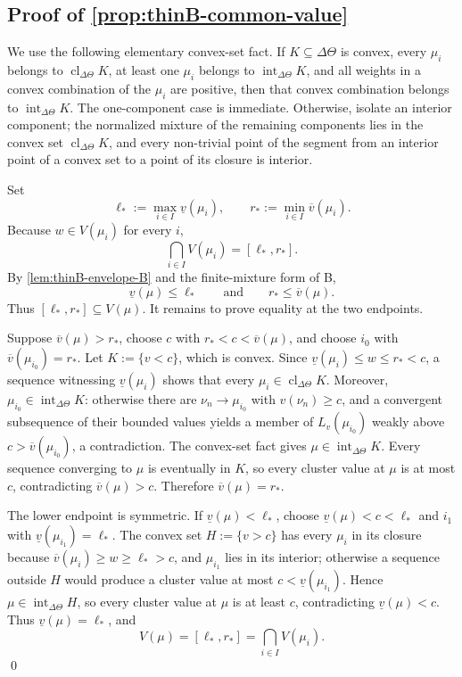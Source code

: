 \documentclass[11pt]{article}
\begin{document}
\subsection*{Proof of \cref{prop:thinB-common-value}}
We use the following elementary convex-set fact. If $K\subseteq\Delta\Theta$ is convex, every $\mu_i$ belongs to $\operatorname{cl}_{\Delta\Theta}K$, at least one $\mu_i$ belongs to $\operatorname{int}_{\Delta\Theta}K$, and all weights in a convex combination of the $\mu_i$ are positive, then that convex combination belongs to $\operatorname{int}_{\Delta\Theta}K$. The one-component case is immediate. Otherwise, isolate an interior component; the normalized mixture of the remaining components lies in the convex set $\operatorname{cl}_{\Delta\Theta}K$, and every non-trivial point of the segment from an interior point of a convex set to a point of its closure is interior.

Set
\[
    \ell_*:=\max_{i\in I}\underline v(\mu_i),
    \qquad
    r_*:=\min_{i\in I}\overline v(\mu_i).
\]
Because $w\in V(\mu_i)$ for every $i$,
\[
    \bigcap_{i\in I}V(\mu_i)=[\ell_*,r_*].
\]
By \cref{lem:thinB-envelope-B} and the finite-mixture form of B,
\[
    \underline v(\mu)\leq\ell_*
    \qquad\text{and}\qquad
    r_*\leq\overline v(\mu).
\]
Thus $[\ell_*,r_*]\subseteq V(\mu)$. It remains to prove equality at the two endpoints.

Suppose $\overline v(\mu)>r_*$, choose $c$ with $r_*<c<\overline v(\mu)$, and choose $i_0$ with $\overline v(\mu_{i_0})=r_*$. Let $K:=\{v<c\}$, which is convex. Since $\underline v(\mu_i)\leq w\leq r_*<c$, a sequence witnessing $\underline v(\mu_i)$ shows that every $\mu_i\in\operatorname{cl}_{\Delta\Theta}K$. Moreover, $\mu_{i_0}\in\operatorname{int}_{\Delta\Theta}K$: otherwise there are $\nu_n\to\mu_{i_0}$ with $v(\nu_n)\geq c$, and a convergent subsequence of their bounded values yields a member of $L_v(\mu_{i_0})$ weakly above $c>\overline v(\mu_{i_0})$, a contradiction. The convex-set fact gives $\mu\in\operatorname{int}_{\Delta\Theta}K$. Every sequence converging to $\mu$ is eventually in $K$, so every cluster value at $\mu$ is at most $c$, contradicting $\overline v(\mu)>c$. Therefore $\overline v(\mu)=r_*$.

The lower endpoint is symmetric. If $\underline v(\mu)<\ell_*$, choose $\underline v(\mu)<c<\ell_*$ and $i_1$ with $\underline v(\mu_{i_1})=\ell_*$. The convex set $H:=\{v>c\}$ has every $\mu_i$ in its closure because $\overline v(\mu_i)\geq w\geq\ell_*>c$, and $\mu_{i_1}$ lies in its interior; otherwise a sequence outside $H$ would produce a cluster value at most $c<\underline v(\mu_{i_1})$. Hence $\mu\in\operatorname{int}_{\Delta\Theta}H$, so every cluster value at $\mu$ is at least $c$, contradicting $\underline v(\mu)<c$. Thus $\underline v(\mu)=\ell_*$, and
\[
    V(\mu)
    =
    [\ell_*,r_*]
    =
    \bigcap_{i\in I}V(\mu_i).
\]
\qed
\end{document}
